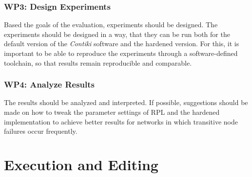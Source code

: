 \documentclass[
  a4paper,
  11pt,
  style=screen,
  extramargin,
  bcor=10mm,
  rgb,
  hyperrefdark,
  abstract=off,
  lnum,
]{tubsartcl}
\begin{document}
\subsubsection{WP3: Design Experiments}

Based the goals of the evaluation, experiments should be designed.
The experiments should be designed in a way, that they can be run both for the default version of the \emph{Contiki} software and the hardened version.
For this, it is important to be able to reproduce the experiments through a software-defined toolchain, so that results remain reproducible and comparable.

\subsubsection{WP4: Analyze Results}

The results should be analyzed and interpreted.
If possible, suggestions should be made on how to tweak the parameter settings of \ac{RPL} and the hardened implementation to achieve better results for networks in which transitive node failures occur frequently.

\newpage

\section{Execution and Editing} %



\newpage



\end{document}
